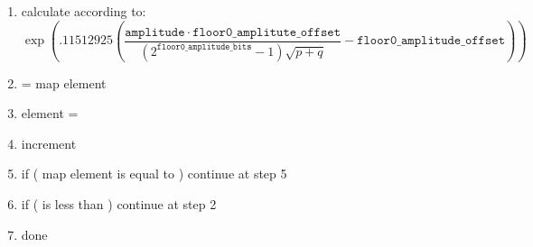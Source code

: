 \begin{enumerate}
{\begin{enumerate}
  \end{enumerate}
  }

 \item calculate  according to:
         \begin{displaymath}
           \exp \left( .11512925 \left(\frac{\mathtt{amplitude} \cdot \mathtt{floor0\_amplitute\_offset}}{(2^{\mathtt{floor0\_amplitude\_bits}}-1)\sqrt{p+q}}
                  - \mathtt{floor0\_amplitude\_offset} \right) \right)
         \end{displaymath}

 \item {} = map element \varname{[i]}
 \item \varname{[output]} element \varname{[i]} = 
 \item increment \varname{[i]}
 \item if ( map element \varname{[i]} is equal to  ) continue at step 5
 \item if ( \varname{[i]} is less than \varname{[n]} ) continue at step 2
 \item done
\end{enumerate}







